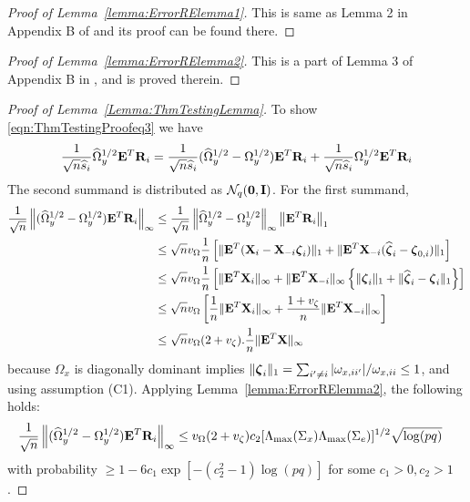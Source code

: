 \begin{proof}[Proof of Lemma~\ref{lemma:ErrorRElemma1}]
This is same as Lemma 2 in Appendix B of \cite{LinEtal16} and its proof can be found there.
\end{proof}

\begin{proof}[Proof of Lemma~\ref{lemma:ErrorRElemma2}]
This is a part of Lemma 3 of Appendix B in \cite{LinEtal16}, and is proved therein. 
\end{proof}

\begin{proof}[Proof of Lemma~\ref{Lemma:ThmTestingLemma}]
To show \eqref{eqn:ThmTestingProofeq3} we have
%
\begin{align*}
\frac{1}{\sqrt n \widehat s_i}  \widehat \Omega_y^{1/2} {\mathbf{E}}^T {\mathbf{R}}_i =
\frac{1}{\sqrt n \widehat s_i}  (\widehat \Omega_y^{1/2} - \Omega_y^{1/2}) {\mathbf{E}}^T {\mathbf{R}}_i +
\frac{1}{\sqrt n \widehat s_i}  \Omega_y^{1/2} {\mathbf{E}}^T {\mathbf{R}}_i
\end{align*}
%
The second summand is distributed as ${\cal{N}}_q ({\bf 0}, {\mathbf{I}})$. For the first summand,
%
\begin{align*}
\frac{1}{\sqrt n}  \left\| (\widehat \Omega_y^{1/2} - \Omega_y^{1/2}) {\mathbf{E}}^T {\mathbf{R}}_i \right\|_\infty & \leq
\frac{1}{\sqrt n}  \left\| \widehat \Omega_y^{1/2} - \Omega_y^{1/2} \right\|_\infty  \left\| {\mathbf{E}}^T {\mathbf{R}}_i \right\|_1 \\
& \leq \sqrt n v_\Omega \frac{1}{n} \left[ \| {\mathbf{E}}^T ({\mathbf{X}}_i -  {\mathbf{X}}_{-i} {\boldsymbol{\zeta}}_i ) \|_1 + \| {\mathbf{E}}^T {\mathbf{X}}_{-i} (\widehat {{\boldsymbol{\zeta}}}_i - {\boldsymbol{\zeta}}_{0,i} ) \|_1 \right] \\
& \leq \sqrt n v_\Omega \frac{1}{n} \left[ \| {\mathbf{E}}^T {\mathbf{X}}_i \|_\infty + \| {\mathbf{E}}^T {\mathbf{X}}_{-i} \|_\infty
\left\{ \| {\boldsymbol{\zeta}}_i  \|_1 + \| \widehat {{\boldsymbol{\zeta}}}_i - {\boldsymbol{\zeta}}_i  \|_1 \right\} \right] \notag\\
& \leq \sqrt n v_\Omega \left[ \frac{1}{n} \| {\mathbf{E}}^T {\mathbf{X}}_i \|_\infty + 
\frac{1 + v_\zeta}{n} \| {\mathbf{E}}^T {\mathbf{X}}_{-i} \|_\infty \right] \\
& \leq \sqrt n v_\Omega (2 + v_\zeta) .\frac{1}{n} \| {\mathbf{E}}^T {\mathbf{X}} \|_\infty
\end{align*}
%
because $\Omega_x$ is diagonally dominant implies $\| {\boldsymbol{\zeta}}_i \|_1 = \sum_{i' \neq i} |\omega_{x,ii'}|/ \omega_{x,ii} \leq 1$, and using assumption (C1). Applying Lemma~\ref{lemma:ErrorRElemma2}, the following holds:
%
\begin{align}\label{eqn:ThmTestingProofeq31}
\frac{1}{\sqrt n}  \left\| (\widehat \Omega_y^{1/2} - \Omega_y^{1/2}) {\mathbf{E}}^T {\mathbf{R}}_i \right\|_\infty & \leq v_\Omega (2 + v_\zeta) c_2 [ \Lambda_{\max} (\Sigma_x) \Lambda_{\max} (\Sigma_e) ]^{1/2} \sqrt{ \log(pq)}
\end{align}
%
with probability $ \geq 1 - 6c_1 \exp [-(c_2^2-1) \log(pq)]$ for some $c_1 >0, c_2 > 1$.


\end{proof}
